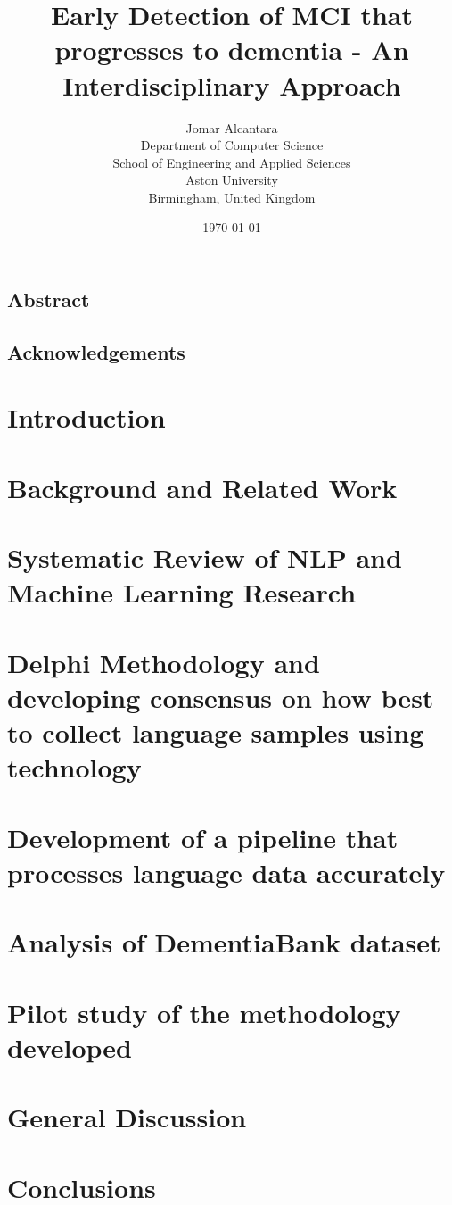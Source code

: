 \documentclass[twopages, a4paper,11pt]{book}
\title{Early Detection of MCI that progresses to dementia - An Interdisciplinary Approach}
\author{
        Jomar Alcantara \\
        Department of Computer Science \\
        School of Engineering and Applied Sciences \\
        Aston University\\
        Birmingham, United Kingdom
}
\date{\today}
\begin{document}
\maketitle
\newpage
\section*{Abstract}
\newpage
\section*{Acknowledgements}
\newpage
\tableofcontents
\newpage
\listoffigures
\listoftables

\chapter{Introduction}


\chapter{Background and Related Work}


\chapter{Systematic Review of NLP and Machine Learning Research}


\chapter{Delphi Methodology and developing consensus on how best to collect language samples using technology}


\chapter{Development of a pipeline that processes language data accurately}


\chapter{Analysis of DementiaBank dataset}


\chapter{Pilot study of the methodology developed}


\chapter{General Discussion}


\chapter{Conclusions}



\end{document}
